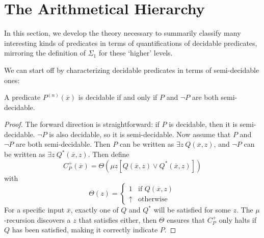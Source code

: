 \section{The Arithmetical Hierarchy}

In this section, we develop the theory necessary to summarily classify many interesting kinds of predicates in terms of quantifications of decidable predicates, mirroring the definition of $\Sigma_1$ for these `higher' levels.

We can start off by characterizing decidable predicates in terms of semi-decidable ones:

\begin{proposition}\label{delta-1}
A predicate $P^{(n)}(\overline{x})$ is decidable if and only if $P$ and $\lnot P$ are both semi-decidable.
\end{proposition}

\begin{proof}
The forward direction is straightforward: if $P$ is decidable, then it is semi-decidable. $\lnot P$ is also decidable, so it is semi-decidable.
Now assume that $P$ and $\lnot P$ are both semi-decidable. Then $P$ can be written as $\exists z \ Q(\overline{x}, z)$, and $\lnot P$ can be written as $\exists z \ Q^*(\overline{x}, z)$. Then define
\[
    C_P^+(\overline{x}) = \Theta\left(\mu z \left[ Q(\overline{x}, z) \lor Q^*(\overline{x}, z)\right]\right)
\] with \[
    \Theta(z) = \begin{cases}
        1 & \text{if } Q(\overline{x}, z) \\
        \uparrow & \text{otherwise}
    \end{cases}
\]
For a specific input $\overline{x}$, exactly one of $Q$ and $Q^*$ will be satisfied for some $z$. The $\mu$-recursion discovers a $z$ that satisfies either, then $\Theta$ ensures that $C_P^+$ only halts if $Q$ has been satisfied, making it correctly indicate $P$.
\end{proof}

